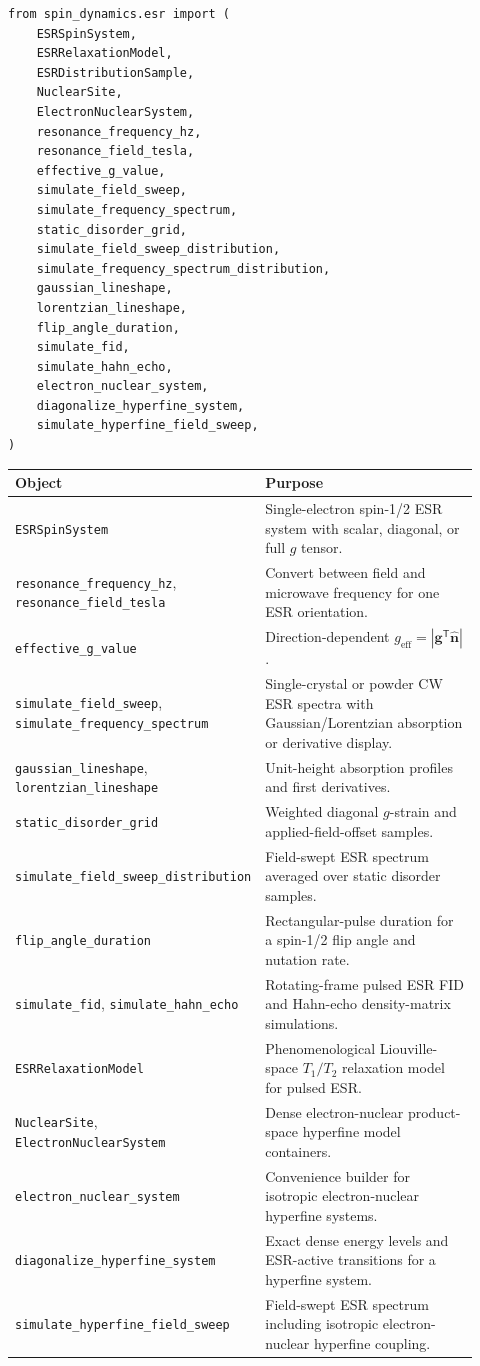 \documentclass[11pt,oneside]{report}
\newcommand{\code}[1]{\texttt{#1}}
\begin{document}
\begin{lstlisting}
from spin_dynamics.esr import (
    ESRSpinSystem,
    ESRRelaxationModel,
    ESRDistributionSample,
    NuclearSite,
    ElectronNuclearSystem,
    resonance_frequency_hz,
    resonance_field_tesla,
    effective_g_value,
    simulate_field_sweep,
    simulate_frequency_spectrum,
    static_disorder_grid,
    simulate_field_sweep_distribution,
    simulate_frequency_spectrum_distribution,
    gaussian_lineshape,
    lorentzian_lineshape,
    flip_angle_duration,
    simulate_fid,
    simulate_hahn_echo,
    electron_nuclear_system,
    diagonalize_hyperfine_system,
    simulate_hyperfine_field_sweep,
)
\end{lstlisting}

\begin{longtable}{p{0.42\linewidth}p{0.50\linewidth}}
\toprule
Object & Purpose \\
\midrule
\code{ESRSpinSystem} & Single-electron spin-1/2 ESR system with scalar, diagonal, or full \(g\) tensor. \\
\code{resonance\_frequency\_hz}, \code{resonance\_field\_tesla} & Convert between field and microwave frequency for one ESR orientation. \\
\code{effective\_g\_value} & Direction-dependent \(g_{\mathrm{eff}}=|\mathbf{g}^{\mathsf{T}}\hat{\mathbf{n}}|\). \\
\code{simulate\_field\_sweep}, \code{simulate\_frequency\_spectrum} & Single-crystal or powder CW ESR spectra with Gaussian/Lorentzian absorption or derivative display. \\
\code{gaussian\_lineshape}, \code{lorentzian\_lineshape} & Unit-height absorption profiles and first derivatives. \\
\code{static\_disorder\_grid} & Weighted diagonal \(g\)-strain and applied-field-offset samples. \\
\code{simulate\_field\_sweep\_distribution} & Field-swept ESR spectrum averaged over static disorder samples. \\
\code{flip\_angle\_duration} & Rectangular-pulse duration for a spin-1/2 flip angle and nutation rate. \\
\code{simulate\_fid}, \code{simulate\_hahn\_echo} & Rotating-frame pulsed ESR FID and Hahn-echo density-matrix simulations. \\
\code{ESRRelaxationModel} & Phenomenological Liouville-space \(T_1/T_2\) relaxation model for pulsed ESR. \\
\code{NuclearSite}, \code{ElectronNuclearSystem} & Dense electron-nuclear product-space hyperfine model containers. \\
\code{electron\_nuclear\_system} & Convenience builder for isotropic electron-nuclear hyperfine systems. \\
\code{diagonalize\_hyperfine\_system} & Exact dense energy levels and ESR-active transitions for a hyperfine system. \\
\code{simulate\_hyperfine\_field\_sweep} & Field-swept ESR spectrum including isotropic electron-nuclear hyperfine coupling. \\
\bottomrule
\end{longtable}
\end{document}

